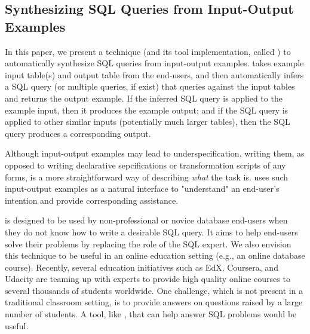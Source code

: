\subsection{Synthesizing SQL Queries from Input-Output Examples}


In this paper, we present a technique (and its tool
implementation, called \ourtool) to automatically synthesize SQL queries
from input-output examples. \ourtool takes example input
table(s) and output table from the end-users, and then automatically
infers a SQL query (or multiple queries, if exist) that queries
against the input tables and returns the output example. If the inferred
SQL query is applied
to the example input, then it produces the example output; and if the
SQL query is applied to other similar inputs (potentially much larger tables),
then the SQL query produces a corresponding output.


Although input-output examples may lead to
underspecification, writing them, as opposed to writing
declarative sepcifications or transformation scripts of any forms,
is a more straightforward way of describing \textit{what} the
task is. \ourtool uses such input-output examples
as a natural interface to "understand" an end-user's intention
and provide corresponding assistance.


\ourtool is designed to be used by non-professional or novice database
end-users when they do not know how
to write a desirable SQL query. It aims to help end-users
solve their problems by replacing the role of the SQL
expert.
We also envision this technique to be useful in an online education
setting (e.g., an online database course). Recently, several
education initiatives such as EdX, Coursera,
and Udacity are teaming up with experts to provide
high quality online courses
to several thousands of students worldwide.
One challenge, which is not present in a traditional classroom
setting, is to provide answers on questions raised by a large
number of students. A tool, like \ourtool,
that can help answer SQL problems would be useful.



